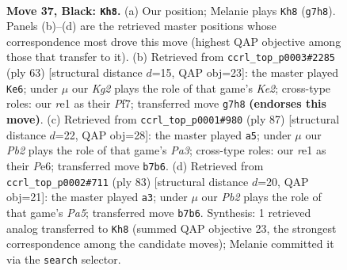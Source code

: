 \documentclass[11pt]{article}
\begin{document}
\clearpage

\begin{figure}[p]\centering
\begin{subfigure}{0.46\textwidth}\centering
\resizebox{\linewidth}{!}{%
\newchessgame
\chessboard[
  setfen={1r6/1p3pk1/p3p3/8/P3P3/5P1P/1R4KP/4R3 b - - 4 37},
  showmover=false,
  pgfstyle=straightmove, color=movearrow, markmove={g7-h8}
]}
\caption{}
\end{subfigure}\hfill
\begin{subfigure}{0.46\textwidth}\centering
\resizebox{\linewidth}{!}{%
\newchessgame
\chessboard[
  setfen={2r5/4kpp1/7p/p1p5/P3P2P/1PR2K2/6P1/8 b - - 2 32},
  showmover=false,
  pgfstyle=straightmove, color=movearrow, markmove={e7-e6}
]}
\caption{}
\end{subfigure}
\\[4pt]
\begin{subfigure}{0.46\textwidth}\centering
\resizebox{\linewidth}{!}{%
\newchessgame
\chessboard[
  setfen={r5k1/5p2/p3p1pp/2P5/8/R3PPP1/6PK/8 b - - 0 44},
  showmover=false,
  pgfstyle=straightmove, color=movearrow, markmove={a6-a5}
]}
\caption{}
\end{subfigure}\hfill
\begin{subfigure}{0.46\textwidth}\centering
\resizebox{\linewidth}{!}{%
\newchessgame
\chessboard[
  setfen={8/5pk1/R5p1/7p/pP3P2/6PP/5PK1/r7 b - - 2 42},
  showmover=false,
  pgfstyle=straightmove, color=movearrow, markmove={a4-a3}
]}
\caption{}
\end{subfigure}
\caption{\textbf{Move 37, Black: \texttt{Kh8}.} (a) Our position; Melanie plays \texttt{Kh8} (\texttt{g7h8}). Panels (b)--(d) are the retrieved master positions whose correspondence most drove this move (highest QAP objective among those that transfer to it). (b) Retrieved from \texttt{ccrl\_top\_p0003\#2285} (ply 63) [structural distance $d$=15, QAP obj=23]: the master played \texttt{Ke6}; under $\mu$ our \emph{Kg2} plays the role of that game's \emph{Ke2}; cross-type roles: our \emph{r}e1 as their \emph{P}f7; transferred move \texttt{g7h8} \textbf{(endorses this move)}. (c) Retrieved from \texttt{ccrl\_top\_p0001\#980} (ply 87) [structural distance $d$=22, QAP obj=28]: the master played \texttt{a5}; under $\mu$ our \emph{Pb2} plays the role of that game's \emph{Pa3}; cross-type roles: our \emph{r}e1 as their \emph{P}e6; transferred move \texttt{b7b6}. (d) Retrieved from \texttt{ccrl\_top\_p0002\#711} (ply 83) [structural distance $d$=20, QAP obj=21]: the master played \texttt{a3}; under $\mu$ our \emph{Pb2} plays the role of that game's \emph{Pa5}; transferred move \texttt{b7b6}. Synthesis: 1 retrieved analog transferred to \texttt{Kh8} (summed QAP objective 23, the strongest correspondence among the candidate moves); Melanie committed it via the \texttt{search} selector.}
\label{fig:thought-m73}
\end{figure}
\end{document}
